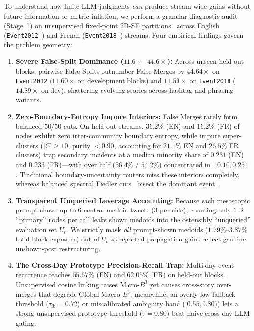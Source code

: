 To understand how finite LLM judgments \emph{can} produce stream-wide gains without future information or metric inflation, we perform a granular diagnostic audit (Stage~1) on unsupervised fixed-point 2D-SE partitions~\citep{li2016structural,cao2024hisevent} across English (\texttt{Event2012}~\citep{mcminn2013building}) and French (\texttt{Event2018}~\citep{mazoyer2020french}) streams. Four empirical findings govern the problem geometry:
\begin{enumerate}
    \item \textbf{Severe False-Split Dominance ($11.6\times$--$44.6\times$):} Across unseen held-out blocks, pairwise False Splits outnumber False Merges by $44.64\times$ on \texttt{Event2012} ($11.60\times$ on development blocks) and $11.59\times$ on \texttt{Event2018} ($14.89\times$ on dev), shattering evolving stories across hashtag and phrasing variants.
    \item \textbf{Zero-Boundary-Entropy Impure Interiors:} False Merges rarely form balanced $50/50$ cuts. On held-out streams, $36.2\%$ (EN) and $16.2\%$ (FR) of nodes exhibit zero inter-community boundary entropy, while impure super-clusters ($|C|\ge 10$, purity $<0.90$, accounting for $21.1\%$ EN and $26.5\%$ FR clusters) trap secondary incidents at a median minority share of $0.231$ (EN) and $0.233$ (FR)---with over half ($56.4\%$ / $54.2\%$) concentrated in $[0.10, 0.25]$. Traditional boundary-uncertainty routers miss these interiors completely, whereas balanced spectral Fiedler cuts~\citep{fiedler1973algebraic} bisect the dominant event.
    \item \textbf{Transparent Unqueried Leverage Accounting:} Because each mesoscopic prompt shows up to $6$ central medoid tweets ($3$ per side), counting only $1$--$2$ ``primary'' nodes per call leaks shown medoids into the ostensibly ``unqueried'' evaluation set $U_t$. We strictly mask \emph{all} prompt-shown medoids ($1.79\%$--$3.87\%$ total block exposure) out of $U_t$ so reported propagation gains reflect genuine unshown-post restructuring.
    \item \textbf{The Cross-Day Prototype Precision-Recall Trap:} Multi-day event recurrence reaches $55.67\%$ (EN) and $62.05\%$ (FR) on held-out blocks. Unsupervised cosine linking raises Micro-$B^3$ yet causes cross-story over-merges that degrade Global Macro-$B^3$; meanwhile, an overly low fallback threshold ($\tau_{\text{fb}}=0.72$) or miscalibrated ambiguity band ($[0.55, 0.80)$) lets a strong unsupervised prototype threshold ($\tau=0.80$) beat naive cross-day LLM gating.
\end{enumerate}

